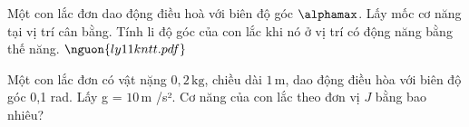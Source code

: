 \begin{ex}Một con lắc đơn dao động điều hoà với biên độ góc $\alphamax$. Lấy mốc cơ năng tại vị trí cân bằng. Tính li độ góc của con lắc khi nó ở vị trí có động năng bằng thế năng. $\nguon{ly11 kntt.pdf}$
\choiceTF

\end{ex}

\begin{ex}
Một con lắc đơn có vật nặng $0,2\,\text{kg}$, chiều dài $1\,\text{m}$, dao động điều hòa với biên độ góc 0,1 rad. Lấy g = $10\,\text{m}$ /s². Cơ năng của con lắc theo đơn vị $J$ bằng bao nhiêu?
\end{ex}


